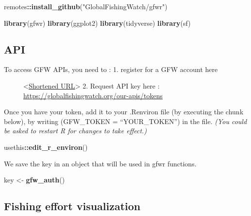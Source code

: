 \documentclass[
]{article}
\newenvironment{Shaded}{\begin{snugshade}}{\end{snugshade}}
\newcommand{\FunctionTok}[1]{\textcolor[rgb]{0.13,0.29,0.53}{\textbf{#1}}}
\newcommand{\NormalTok}[1]{#1}
\newcommand{\OtherTok}[1]{\textcolor[rgb]{0.56,0.35,0.01}{#1}}
\newcommand{\SpecialCharTok}[1]{\textcolor[rgb]{0.81,0.36,0.00}{\textbf{#1}}}
\newcommand{\StringTok}[1]{\textcolor[rgb]{0.31,0.60,0.02}{#1}}
\begin{document}
\begin{Shaded}
\begin{Highlighting}[]
\NormalTok{remotes}\SpecialCharTok{::}\FunctionTok{install\_github}\NormalTok{(}\StringTok{"GlobalFishingWatch/gfwr"}\NormalTok{)}
\end{Highlighting}
\end{Shaded}

\begin{Shaded}
\begin{Highlighting}[]
\FunctionTok{library}\NormalTok{(gfwr)}
\FunctionTok{library}\NormalTok{(ggplot2)}
\FunctionTok{library}\NormalTok{(tidyverse)}
\FunctionTok{library}\NormalTok{(sf)}
\end{Highlighting}
\end{Shaded}

\hypertarget{api}{%
\subsection{API}\label{api}}

\begin{description}
\item[To access GFW APIs, you need to : 1. register for a GFW account
here]
\textless{}\href{https://tinyurl.com/2pr5nxxk}{Shortened
URL}\textgreater{} 2. Request API key here :
\url{https://globalfishingwatch.org/our-apis/tokens}
\end{description}

Once you have your token, add it to your .Renviron file (by executing
the chunk below), by writing (GFW\_TOKEN = ``YOUR\_TOKEN'') in the file.
\emph{(You could be asked to restart R for changes to take effect.)}

\begin{Shaded}
\begin{Highlighting}[]
\NormalTok{usethis}\SpecialCharTok{::}\FunctionTok{edit\_r\_environ}\NormalTok{()}
\end{Highlighting}
\end{Shaded}

We save the key in an object that will be used in gfwr functions.

\begin{Shaded}
\begin{Highlighting}[]
\NormalTok{key }\OtherTok{\textless{}{-}} \FunctionTok{gfw\_auth}\NormalTok{()}
\end{Highlighting}
\end{Shaded}

\hypertarget{fishing-effort-visualization}{%
\subsection{Fishing effort
visualization}\label{fishing-effort-visualization}}
\end{document}

